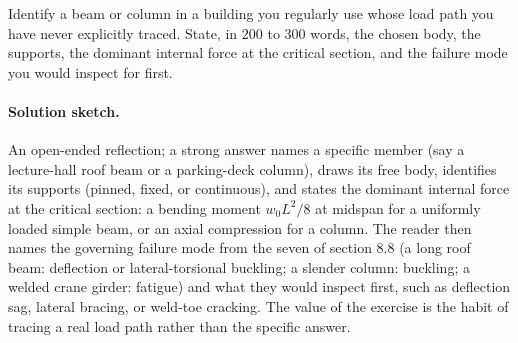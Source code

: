 \begin{exercise}
Identify a beam or column in a building you regularly use whose
load path you have never explicitly traced. State, in $200$ to
$300$ words, the chosen body, the supports, the dominant internal
force at the critical section, and the failure mode you would
inspect for first.

\paragraph{Solution sketch.} An open-ended reflection; a strong answer
names a specific member (say a lecture-hall roof beam or a parking-deck
column), draws its free body, identifies its supports (pinned, fixed,
or continuous), and states the dominant internal force at the critical
section: a bending moment $w_0L^2/8$ at midspan for a uniformly loaded
simple beam, or an axial compression for a column. The reader then
names the governing failure mode from the seven of section 8.8 (a long
roof beam: deflection or lateral-torsional buckling; a slender column:
buckling; a welded crane girder: fatigue) and what they would inspect
first, such as deflection sag, lateral bracing, or weld-toe cracking.
The value of the exercise is the habit of tracing a real load path
rather than the specific answer.
\end{exercise}
